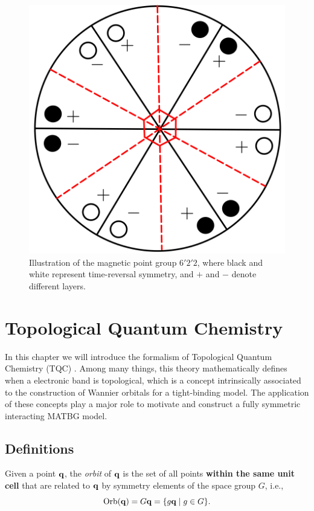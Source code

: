 \documentclass[12pt]{report}
\begin{document}
\begin{figure}[H]
\centering
\includegraphics[width=0.5\linewidth]{fig/622_magnetic.png}
\caption{Illustration of the magnetic point group \(6'2'2\), where black and white represent time-reversal symmetry, and \(+\) and \(-\) denote different layers.}
\label{fig:622_magnetic}
\end{figure}

\section{Topological Quantum Chemistry} \label{sec:topological_quantum_chemistry}

In this chapter we will introduce the formalism of Topological Quantum Chemistry (TQC) \cite{topological_quantum_chemistry2017, building_blocks2018, lectures_tms2017}. Among many things, this theory mathematically defines when a electronic band is topological, which is a concept intrinsically associated to the construction of Wannier orbitals for a tight-binding model. The application of these concepts play a major role to motivate and construct a fully symmetric interacting MATBG model.

\subsection{Definitions} \label{subsec:tqc_definitions}


\begin{definition} \label{def:orbit_q}
Given a point \({\vb{q}}\), the \textit{orbit} of \({\vb{q}}\) is the set of all points \textbf{within the same unit cell} that are related to \({\vb{q}}\) by symmetry elements of the space group \(G\), i.e.,
\begin{equation} \label{eq:orbit_of_q}
\text{Orb}({\vb{q}}) = G {\vb{q}} = \{g {\vb{q}} \mid g \in G\}.
\end{equation}
\end{definition}
\end{document}
